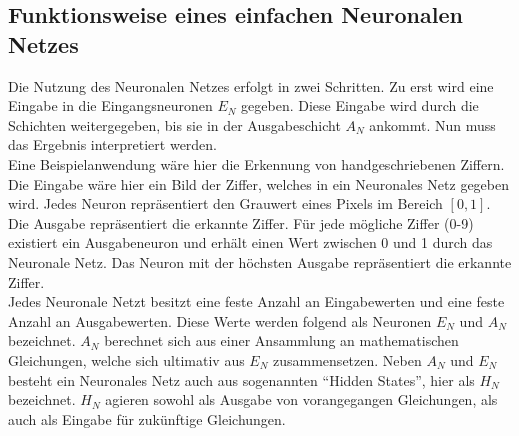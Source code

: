 \subsection{Funktionsweise eines einfachen Neuronalen Netzes}
Die Nutzung des Neuronalen Netzes erfolgt in zwei Schritten.
Zu erst wird eine Eingabe in die Eingangsneuronen $E_N$ gegeben. Diese Eingabe wird durch die Schichten weitergegeben, bis sie in der Ausgabeschicht $A_N$ ankommt.
Nun muss das Ergebnis interpretiert werden.\\

Eine Beispielanwendung wäre hier die Erkennung von handgeschriebenen Ziffern.
Die Eingabe wäre hier ein Bild der Ziffer, welches in ein Neuronales Netz gegeben wird.
Jedes Neuron repräsentiert den Grauwert eines Pixels im Bereich $[0,1]$.
Die Ausgabe repräsentiert die erkannte Ziffer. Für jede mögliche Ziffer (0-9) existiert ein Ausgabeneuron und erhält einen Wert zwischen 0 und 1 durch das Neuronale Netz. Das Neuron mit der höchsten Ausgabe repräsentiert die erkannte Ziffer.\\

Jedes Neuronale Netzt besitzt eine feste Anzahl an Eingabewerten und eine feste Anzahl an Ausgabewerten.
Diese Werte werden folgend als Neuronen $E_N$ und $A_N$ bezeichnet.
$A_N$ berechnet sich aus einer Ansammlung an mathematischen Gleichungen, welche sich ultimativ aus  $E_N$ zusammensetzen.
Neben $A_N$ und $E_N$ besteht ein Neuronales Netz auch aus sogenannten \enquote{Hidden States}, hier als $H_N$ bezeichnet.
$H_N$ agieren sowohl als Ausgabe von vorangegangen Gleichungen, als auch als Eingabe für zukünftige Gleichungen.\\


